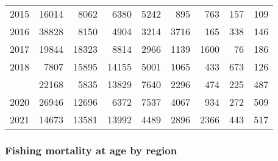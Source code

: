 \documentclass[
]{article}
\begin{document}
\begin{longtable}[t]{lrrrrrrrr}
2015 & 16014 & 8062 & 6380 & 5242 & 895 & 763 & 157 & 109\\
2016 & 38828 & 8150 & 4904 & 3214 & 3716 & 165 & 338 & 146\\
2017 & 19844 & 18323 & 8814 & 2966 & 1139 & 1600 & 76 & 186\\
2018 & 7807 & 15895 & 14155 & 5001 & 1065 & 433 & 673 & 126\\
\addlinespace
2019 & 22168 & 5835 & 13829 & 7640 & 2296 & 474 & 225 & 487\\
2020 & 26946 & 12696 & 6372 & 7537 & 4067 & 934 & 272 & 509\\
2021 & 14673 & 13581 & 13992 & 4489 & 2896 & 2366 & 443 & 517\\*
\end{longtable}

\hypertarget{fishing-mortality-at-age-by-region}{%
\subsubsection{Fishing mortality at age by
region}\label{fishing-mortality-at-age-by-region}}
\end{document}
